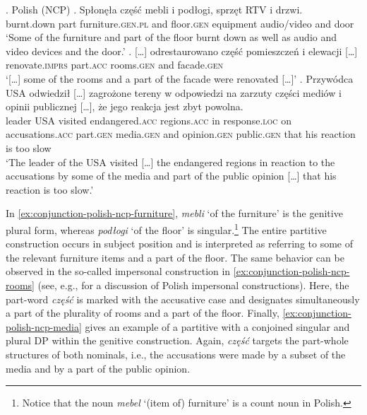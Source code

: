 \ex. Polish (NCP)\label{ex:conjunction-polish-ncp}
\ag. Spłonęła część mebli i podłogi, sprzęt RTV i drzwi.\\
burnt.down part furniture\textsc{.gen.pl} and floor\textsc{.gen} equipment audio/video and door\\
`Some of the furniture and part of the floor burnt down as well as audio and video devices and the door.'\label{ex:conjunction-polish-ncp-furniture}
\bg. [\dots] odrestaurowano część pomieszczeń i elewacji [\dots]\\
{} renovate\textsc{.imprs} part\textsc{.acc} rooms\textsc{.gen} and facade\textsc{.gen} {}\\
`[\dots] some of the rooms and a part of the facade were renovated [\dots]'\label{ex:conjunction-polish-ncp-rooms}
\bg. Przywódca USA odwiedził [\dots] zagrożone tereny w odpowiedzi na zarzuty części mediów i opinii publicznej [\dots], że jego reakcja jest zbyt powolna.\\
leader USA visited {} endangered\textsc{.acc} regions\textsc{.acc} in response\textsc{.loc} on accusations\textsc{.acc} part\textsc{.gen} media\textsc{.gen} and opinion\textsc{.gen} public\textsc{.gen} {} that his reaction is too slow\\
`The leader of the USA visited [\dots] the endangered regions in reaction to the accusations by some of the media and part of the public opinion [\dots] that his reaction is too slow.'\label{ex:conjunction-polish-ncp-media}

In \ref{ex:conjunction-polish-ncp-furniture}, \textit{mebli} `of the furniture' is the genitive plural form, whereas \textit{podłogi} `of the floor' is singular.\footnote{Notice that the noun \textit{mebel} `(item of) furniture' is a count noun in Polish.} The entire partitive construction occurs in subject position and is interpreted as referring to some of the relevant furniture items and a part of the floor. The same behavior can be observed in the so-called impersonal construction in \ref{ex:conjunction-polish-ncp-rooms} (see, e.g., \citealt{lavine2005morphosyntax,ruda2014impersonal} for a discussion of Polish impersonal constructions). Here, the part-word \textit{część} is marked with the accusative case and designates simultaneously a part of the plurality of rooms and a part of the floor. Finally, \ref{ex:conjunction-polish-ncp-media} gives an example of a partitive with a conjoined singular and plural DP within the genitive construction. Again, \textit{część} targets the part-whole structures of both nominals, i.e., the accusations were made by a subset of the media and by a part of the public opinion.

